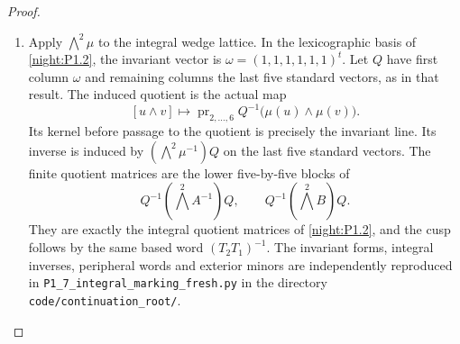 \documentclass[11pt,a4paper]{article}
\theoremstyle{definition}
\begin{document}
\begin{proof}
\begin{enumerate}[label=\arabic*.]
\item Apply $\bigwedge^2\mu$ to the integral wedge lattice. In the
lexicographic basis of \cref{night:P1.2}, the invariant vector is
$\omega=(1,1,1,1,1,1)^t$. Let $Q$ have first column $\omega$ and
remaining columns the last five standard vectors, as in that result.
The induced quotient is the actual map
\[
 [u\wedge v]\longmapsto
 \operatorname{pr}_{2,\ldots,6}
 Q^{-1}\bigl(\mu(u)\wedge\mu(v)\bigr).
\]
Its kernel before passage to the quotient is precisely the invariant
line. Its inverse is induced by $(\bigwedge^2\mu^{-1})Q$ on the last
five standard vectors. The finite quotient matrices are the lower
five-by-five blocks of
\[
 Q^{-1}(\bigwedge^2 A^{-1})Q,\qquad
 Q^{-1}(\bigwedge^2 B)Q.
\]
They are exactly the integral quotient matrices of
\cref{night:P1.2}, and the cusp follows by the same based word
$(T_2T_1)^{-1}$. The invariant forms, integral inverses, peripheral
words and exterior minors are independently reproduced in
\texttt{P1\_7\_integral\_marking\_fresh.py} in the directory 
\texttt{code/continuation\_root/}.
\end{enumerate}
\end{proof}
\end{document}
